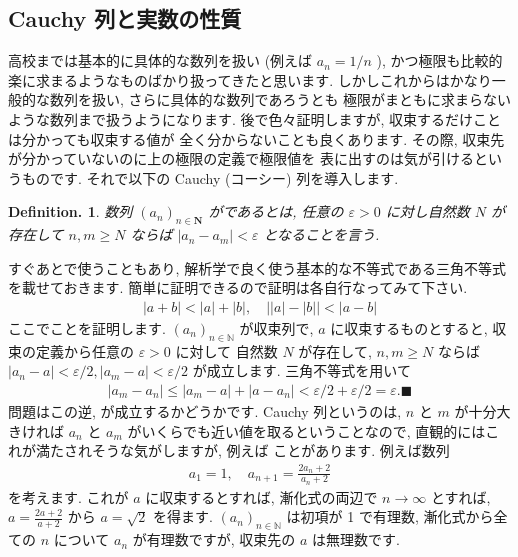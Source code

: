 \documentclass[openany, a4paper, oneside]{book}
\theoremstyle{break}
\theoremstyle{breakdefn}
\newtheorem{defn}[thm]{Definition.}
\newcommand{\bN}{\mathbb{N}}
\newcommand{\bs}{\blacksquare}
\newcommand{\vep}{\varepsilon}
\newcommand{\an}{(a_n)_{n{\in}{\bN}}}
\begin{document}
\subsection{Cauchy 列と実数の性質}
\label{sec-5-2-2-2}

高校までは基本的に具体的な数列を扱い (例えば $a_n = 1/n$ ),
かつ極限も比較的楽に求まるようなものばかり扱ってきたと思います.
しかしこれからはかなり一般的な数列を扱い, さらに具体的な数列であろうとも
極限がまともに求まらないような数列まで扱うようになります.
後で色々証明しますが, 収束するだけことは分かっても収束する値が
全く分からないことも良くあります.
その際, 収束先が分かっていないのに上の極限の定義で極限値を
表に出すのは気が引けるというものです.
それで以下の Cauchy (コーシー) 列を導入します.
\begin{defn}数列 $(a_n)_{n \in \bm{N}}$ がであるとは,
任意の $\varepsilon >0$ に対し自然数 $N$ が存在して
 $n,m \geq N$ ならば $|a_n - a_m|<\varepsilon$ となることを言う.
\end{defn}
すぐあとで使うこともあり, 解析学で良く使う基本的な不等式である三角不等式を載せておきます.
簡単に証明できるので証明は各自行なってみて下さい.
    \begin{align}
        |a+b|<|a|+|b|,
        \quad
        \bigl | |a|-|b| \bigr | < |a-b|
    \end{align}
ここでことを証明します.
 $\an$ が収束列で,  $a$ に収束するものとすると, 収束の定義から任意の $\vep>0$ に対して
自然数 $N$ が存在して,  $n,m\geq N$ ならば $|a_n-a|<\vep/2,|a_m-a|<\vep/2$ が成立します.
三角不等式を用いて
    \begin{align}
        |a_m - a_n|
        \leq
        |a_m - a | + |a - a_n |
        <\vep/2 + \vep/2
        =
        \vep. \bs
    \end{align}
問題はこの逆, が成立するかどうかです.
Cauchy 列というのは,  $n$ と $m$ が十分大きければ $a_n$ と $a_m$ がいくらでも近い値を取るということなので,
直観的にはこれが満たされそうな気がしますが, 例えば
ことがあります.
例えば数列
    \begin{align}
        a_1=1,
        \quad
        a_{n+1}
        =
        \frac{2a_n+2} {a_n+2}
    \end{align}
を考えます. これが $a$ に収束するとすれば, 漸化式の両辺で $n\to\infty$ とすれば,
 $a=\frac{2a+2}{a+2}$ から $a=\sqrt{2}$ を得ます.
 $\an$ は初項が 1 で有理数, 漸化式から全ての $n$ について $a_n$ が有理数ですが, 収束先の $a$ は無理数です.
\end{document}
